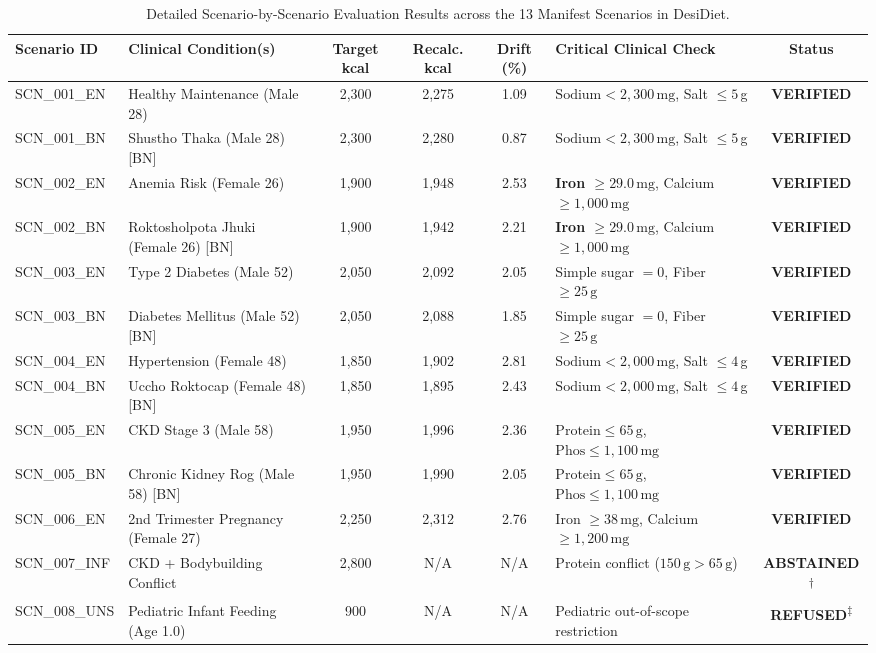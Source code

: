 \documentclass[5p,times,twocolumn]{elsarticle}
\makeatletter
\def\systemname{DesiDiet}%
\def\my@bx{bx}
\def\my@b{b}
\DeclareRobustCommand{\systemname}{%
  \texorpdfstring{%
    \ifx\f@series\my@bx
      DesiDiet%
    \else\ifx\f@series\my@b
      DesiDiet%
    \else
      \textsc{DesiDiet}%
    \fi\fi
  }{DesiDiet}%
}
\makeatother
\begin{document}
\begin{table}[!t]
\centering
\caption{Detailed Scenario-by-Scenario Evaluation Results across the 13 Manifest Scenarios in \systemname{}.}
\label{tab:scenario_breakdown}
\footnotesize
\begin{tabularx}{\textwidth}{lp{3.0cm}ccc>{\raggedright\arraybackslash}Xc}
\toprule
\textbf{Scenario ID} & \textbf{Clinical Condition(s)} & \textbf{Target kcal} & \textbf{Recalc. kcal} & \textbf{Drift (\%)} & \textbf{Critical Clinical Check} & \textbf{Status} \\
\midrule
SCN\_001\_EN & Healthy Maintenance (Male 28) & 2,300 & 2,275 & 1.09 & $\text{Sodium} < 2,300\,\text{mg}$, Salt $\le 5$\,g & \textbf{VERIFIED} \\
SCN\_001\_BN & Shustho Thaka (Male 28) [BN] & 2,300 & 2,280 & 0.87 & $\text{Sodium} < 2,300\,\text{mg}$, Salt $\le 5$\,g & \textbf{VERIFIED} \\
SCN\_002\_EN & Anemia Risk (Female 26) & 1,900 & 1,948 & 2.53 & \textbf{Iron $\ge 29.0\,\text{mg}$}, Calcium $\ge 1,000\,\text{mg}$ & \textbf{VERIFIED} \\
SCN\_002\_BN & Roktosholpota Jhuki (Female 26) [BN] & 1,900 & 1,942 & 2.21 & \textbf{Iron $\ge 29.0\,\text{mg}$}, Calcium $\ge 1,000\,\text{mg}$ & \textbf{VERIFIED} \\
SCN\_003\_EN & Type 2 Diabetes (Male 52) & 2,050 & 2,092 & 2.05 & Simple sugar $=0$, Fiber $\ge 25\,\text{g}$ & \textbf{VERIFIED} \\
SCN\_003\_BN & Diabetes Mellitus (Male 52) [BN] & 2,050 & 2,088 & 1.85 & Simple sugar $=0$, Fiber $\ge 25\,\text{g}$ & \textbf{VERIFIED} \\
SCN\_004\_EN & Hypertension (Female 48) & 1,850 & 1,902 & 2.81 & $\text{Sodium} < 2,000\,\text{mg}$, Salt $\le 4$\,g & \textbf{VERIFIED} \\
SCN\_004\_BN & Uccho Roktocap (Female 48) [BN] & 1,850 & 1,895 & 2.43 & $\text{Sodium} < 2,000\,\text{mg}$, Salt $\le 4$\,g & \textbf{VERIFIED} \\
SCN\_005\_EN & CKD Stage 3 (Male 58) & 1,950 & 1,996 & 2.36 & $\text{Protein} \le 65\,\text{g}$, $\text{Phos} \le 1,100\,\text{mg}$ & \textbf{VERIFIED} \\
SCN\_005\_BN & Chronic Kidney Rog (Male 58) [BN] & 1,950 & 1,990 & 2.05 & $\text{Protein} \le 65\,\text{g}$, $\text{Phos} \le 1,100\,\text{mg}$ & \textbf{VERIFIED} \\
SCN\_006\_EN & 2nd Trimester Pregnancy (Female 27) & 2,250 & 2,312 & 2.76 & Iron $\ge 38\,\text{mg}$, Calcium $\ge 1,200\,\text{mg}$ & \textbf{VERIFIED} \\
SCN\_007\_INF & CKD + Bodybuilding Conflict & 2,800 & N/A & N/A & Protein conflict ($150\,\text{g} > 65\,\text{g}$) & \textbf{ABSTAINED}\textsuperscript{$\dagger$} \\
SCN\_008\_UNS & Pediatric Infant Feeding (Age 1.0) & 900 & N/A & N/A & Pediatric out-of-scope restriction & \textbf{REFUSED}\textsuperscript{$\ddagger$} \\
\bottomrule
\end{tabularx}


\end{table}
\end{document}
